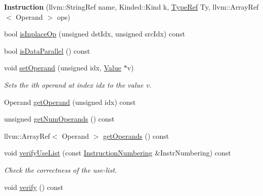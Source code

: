 \begin{DoxyCompactItemize}
\mbox{\label{classglow_1_1_instruction_af3a6194aacf60683107613a22a43eb03}} 
{\bfseries Instruction} (llvm\+::\+String\+Ref name, Kinded\+::\+Kind k, \hyperlink{structglow_1_1_type}{Type\+Ref} Ty, llvm\+::\+Array\+Ref$<$ Operand $>$ ops)
\item 
bool \hyperlink{classglow_1_1_instruction_ac942cb4d52b84f25c428100a6009ed91}{is\+Inplace\+Op} (unsigned dst\+Idx, unsigned src\+Idx) const
\item 
bool \hyperlink{classglow_1_1_instruction_a0f4e0d6d07308627de111ff84a5bd7d4}{is\+Data\+Parallel} () const
\item 
\mbox{\label{classglow_1_1_instruction_a597bfb61ab070b97b246ed75f21f1294}} 
void \hyperlink{classglow_1_1_instruction_a597bfb61ab070b97b246ed75f21f1294}{set\+Operand} (unsigned idx, \hyperlink{classglow_1_1_value}{Value} $\ast$v)
\begin{DoxyCompactList}\small\item\em Sets the ith operand at index {\ttfamily idx} to the value {\ttfamily v}. \end{DoxyCompactList}\item 
Operand \hyperlink{classglow_1_1_instruction_ad8c63e8f5be507967615ef7247580926}{get\+Operand} (unsigned idx) const
\item 
unsigned \hyperlink{classglow_1_1_instruction_a6a6369ae28aa26f79aeb185dc18bf5bb}{get\+Num\+Operands} () const
\item 
llvm\+::\+Array\+Ref$<$ Operand $>$ \hyperlink{classglow_1_1_instruction_a5ae3498b8bd63edb56057006673a37da}{get\+Operands} () const
\item 
\mbox{\label{classglow_1_1_instruction_a0bd5b0491b63a12fa4278f861ccd46d3}} 
void \hyperlink{classglow_1_1_instruction_a0bd5b0491b63a12fa4278f861ccd46d3}{verify\+Use\+List} (const \hyperlink{classglow_1_1_instruction_numbering}{Instruction\+Numbering} \&Instr\+Numbering) const
\begin{DoxyCompactList}\small\item\em Check the correctness of the use-\/list. \end{DoxyCompactList}\item 
\mbox{\label{classglow_1_1_instruction_ae470d54098f70fed4ef4ffe986ef6872}} 
void \hyperlink{classglow_1_1_instruction_ae470d54098f70fed4ef4ffe986ef6872}{verify} () const

\end{DoxyCompactItemize}
